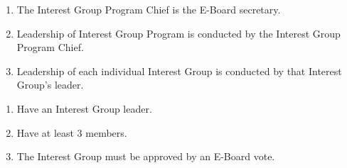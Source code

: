 \begin{enumerate}
  \item The Interest Group Program Chief is the E-Board secretary.
  \item Leadership of Interest Group Program is conducted by the Interest Group
    Program Chief.
  \item Leadership of each individual Interest Group is conducted by that
    Interest Group's leader.
\end{enumerate}


\begin{enumerate}
  \item Have an Interest Group leader.
  \item Have at least 3 members.
  \item The Interest Group must be approved by an E-Board vote.
\end{enumerate}
